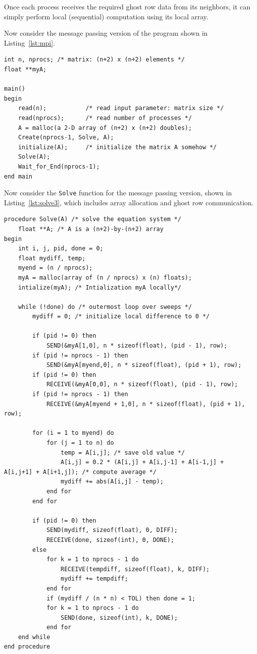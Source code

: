 \documentclass[12pt]{book}
\begin{document}
Once each process receives the required ghost row data from its neighbors, it can simply perform local (sequential) computation using its local array.

Now consider the message passing version of the program shown in Listing~\ref{lst:mpi}.

\begin{lstlisting}[style=cppstyle,caption={Message Passing Version - Main Function},captionpos=b,label={lst:mpi}]
int n, nprocs; /* matrix: (n+2) x (n+2) elements */
float **myA;

main()
begin
    read(n);           /* read input parameter: matrix size */
    read(nprocs);      /* read number of processes */
    A = malloc(a 2-D array of (n+2) x (n+2) doubles);
    Create(nprocs-1, Solve, A);
    initialize(A);     /* initialize the matrix A somehow */
    Solve(A);
    Wait_for_End(nprocs-1);
end main
\end{lstlisting}


Now consider the \texttt{Solve} function for the message passing version, shown in Listing~\ref{lst:solve3}, which includes array allocation and ghost row communication.

\begin{lstlisting}[style=cppstyle,caption={MPI - Solve Function},captionpos=b,label={lst:solve3}]
procedure Solve(A) /* solve the equation system */
    float **A; /* A is a (n+2)-by-(n+2) array
begin
    int i, j, pid, done = 0;
    float mydiff, temp;
    myend = (n / nprocs);
    myA = malloc(array of (n / nprocs) x (n) floats);
    intialize(myA); /* Intialization myA locally*/
    
    while (!done) do /* outermost loop over sweeps */
        mydiff = 0; /* initialize local difference to 0 */

        if (pid != 0) then
            SEND(&myA[1,0], n * sizeof(float), (pid - 1), row);
        if (pid != nprocs - 1) then
            SEND(&myA[myend,0], n * sizeof(float), (pid + 1), row);
        if (pid != 0) then
            RECEIVE(&myA[0,0], n * sizeof(float), (pid - 1), row);
        if (pid != nprocs - 1) then
            RECEIVE(&myA[myend + 1,0], n * sizeof(float), (pid + 1), row);

        for (i = 1 to myend) do
            for (j = 1 to n) do
                temp = A[i,j]; /* save old value */
                A[i,j] = 0.2 * (A[i,j] + A[i,j-1] + A[i-1,j] + A[i,j+1] + A[i+1,j]); /* compute average */
                mydiff += abs(A[i,j] - temp);
            end for
        end for

        if (pid != 0) then
            SEND(mydiff, sizeof(float), 0, DIFF);
            RECEIVE(done, sizeof(int), 0, DONE);
        else
            for k = 1 to nprocs - 1 do
                RECEIVE(tempdiff, sizeof(float), k, DIFF);
                mydiff += tempdiff;
            end for
            if (mydiff / (n * n) < TOL) then done = 1;
            for k = 1 to nprocs - 1 do
                SEND(done, sizeof(int), k, DONE);
            end for
    end while
end procedure
\end{lstlisting}
\end{document}
